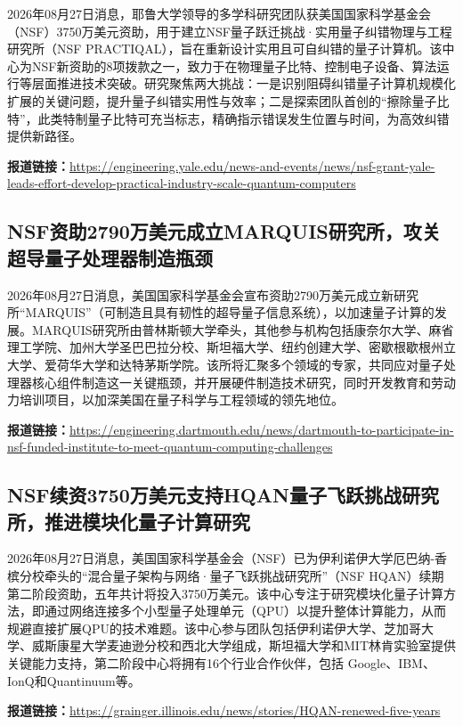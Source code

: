 \documentclass[12pt,a4paper]{ctexart}
\begin{document}
2026年08月27日消息，耶鲁大学领导的多学科研究团队获美国国家科学基金会（NSF）3750万美元资助，用于建立NSF量子跃迁挑战·实用量子纠错物理与工程研究所（NSF PRACTIQAL），旨在重新设计实用且可自纠错的量子计算机。该中心为NSF新资助的8项拨款之一，致力于在物理量子比特、控制电子设备、算法运行等层面推进技术突破。研究聚焦两大挑战：一是识别阻碍纠错量子计算机规模化扩展的关键问题，提升量子纠错实用性与效率；二是探索团队首创的“擦除量子比特”，此类特制量子比特可充当标志，精确指示错误发生位置与时间，为高效纠错提供新路径。

\noindent\textbf{报道链接：}\url{https://engineering.yale.edu/news-and-events/news/nsf-grant-yale-leads-effort-develop-practical-industry-scale-quantum-computers}

\subsection{ NSF资助2790万美元成立MARQUIS研究所，攻关超导量子处理器制造瓶颈 }

2026年08月27日消息，美国国家科学基金会宣布资助2790万美元成立新研究所“MARQUIS”（可制造且具有韧性的超导量子信息系统），以加速量子计算的发展。MARQUIS研究所由普林斯顿大学牵头，其他参与机构包括康奈尔大学、麻省理工学院、加州大学圣巴巴拉分校、斯坦福大学、纽约创建大学、密歇根歇根州立大学、爱荷华大学和达特茅斯学院。该所将汇聚多个领域的专家，共同应对量子处理器核心组件制造这一关键瓶颈，并开展硬件制造技术研究，同时开发教育和劳动力培训项目，以加深美国在量子科学与工程领域的领先地位。

\noindent\textbf{报道链接：}\url{https://engineering.dartmouth.edu/news/dartmouth-to-participate-in-nsf-funded-institute-to-meet-quantum-computing-challenges}

\subsection{ NSF续资3750万美元支持HQAN量子飞跃挑战研究所，推进模块化量子计算研究 }

2026年08月27日消息，美国国家科学基金会（NSF）已为伊利诺伊大学厄巴纳-香槟分校牵头的“混合量子架构与网络·量子飞跃挑战研究所”（NSF HQAN）续期第二阶段资助，五年共计将投入3750万美元。该中心专注于研究模块化量子计算方法，即通过网络连接多个小型量子处理单元（QPU）以提升整体计算能力，从而规避直接扩展QPU的技术难题。该中心参与团队包括伊利诺伊大学、芝加哥大学、威斯康星大学麦迪逊分校和西北大学组成，斯坦福大学和MIT林肯实验室提供关键能力支持，第二阶段中心将拥有16个行业合作伙伴，包括 Google、IBM、IonQ和Quantinuum等。

\noindent\textbf{报道链接：}\url{https://grainger.illinois.edu/news/stories/HQAN-renewed-five-years}
\end{document}
